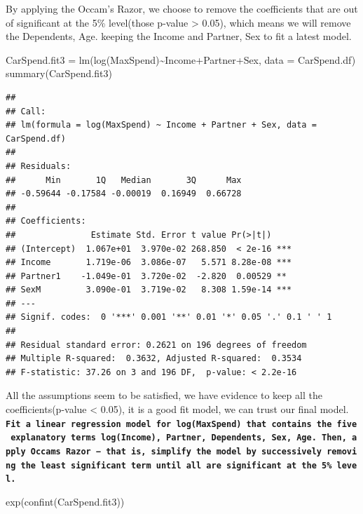 \documentclass[
]{article}
\newenvironment{Shaded}{\begin{snugshade}}{\end{snugshade}}
\newcommand{\AttributeTok}[1]{\textcolor[rgb]{0.77,0.63,0.00}{#1}}
\newcommand{\FunctionTok}[1]{\textcolor[rgb]{0.00,0.00,0.00}{#1}}
\newcommand{\NormalTok}[1]{#1}
\newcommand{\OtherTok}[1]{\textcolor[rgb]{0.56,0.35,0.01}{#1}}
\newcommand{\SpecialCharTok}[1]{\textcolor[rgb]{0.00,0.00,0.00}{#1}}
\begin{document}
By applying the Occam's Razor, we choose to remove the coefficients that
are out of significant at the 5\% level(those p-value \textgreater{}
0.05), which means we will remove the Dependents, Age. keeping the
Income and Partner, Sex to fit a latest model.

\begin{Shaded}
\begin{Highlighting}[]
\NormalTok{CarSpend.fit3 }\OtherTok{=} \FunctionTok{lm}\NormalTok{(}\FunctionTok{log}\NormalTok{(MaxSpend)}\SpecialCharTok{\textasciitilde{}}\NormalTok{Income}\SpecialCharTok{+}\NormalTok{Partner}\SpecialCharTok{+}\NormalTok{Sex, }\AttributeTok{data =}\NormalTok{ CarSpend.df)}
\FunctionTok{summary}\NormalTok{(CarSpend.fit3)}
\end{Highlighting}
\end{Shaded}

\begin{verbatim}
## 
## Call:
## lm(formula = log(MaxSpend) ~ Income + Partner + Sex, data = CarSpend.df)
## 
## Residuals:
##      Min       1Q   Median       3Q      Max 
## -0.59644 -0.17584 -0.00019  0.16949  0.66728 
## 
## Coefficients:
##               Estimate Std. Error t value Pr(>|t|)    
## (Intercept)  1.067e+01  3.970e-02 268.850  < 2e-16 ***
## Income       1.719e-06  3.086e-07   5.571 8.28e-08 ***
## Partner1    -1.049e-01  3.720e-02  -2.820  0.00529 ** 
## SexM         3.090e-01  3.719e-02   8.308 1.59e-14 ***
## ---
## Signif. codes:  0 '***' 0.001 '**' 0.01 '*' 0.05 '.' 0.1 ' ' 1
## 
## Residual standard error: 0.2621 on 196 degrees of freedom
## Multiple R-squared:  0.3632, Adjusted R-squared:  0.3534 
## F-statistic: 37.26 on 3 and 196 DF,  p-value: < 2.2e-16
\end{verbatim}

All the assumptions seem to be satisfied, we have evidence to keep all
the coefficients(p-value \textless{} 0.05), it is a good fit model, we
can trust our final model.
\textbf{\texttt{Fit\ a\ linear\ regression\ model\ for\ log(MaxSpend)\ that\ contains\ the\ five\ explanatory\ terms\ log(Income),\ Partner,\ Dependents,\ Sex,\ Age.\ Then,\ apply\ Occam\textquotesingle{}s\ Razor\ −\ that\ is,\ simplify\ the\ model\ by\ successively\ removing\ the\ least\ significant\ term\ until\ all\ are\ significant\ at\ the\ 5\%\ level.}}

\begin{Shaded}
\begin{Highlighting}[]
\FunctionTok{exp}\NormalTok{(}\FunctionTok{confint}\NormalTok{(CarSpend.fit3))}
\end{Highlighting}
\end{Shaded}
\end{document}
